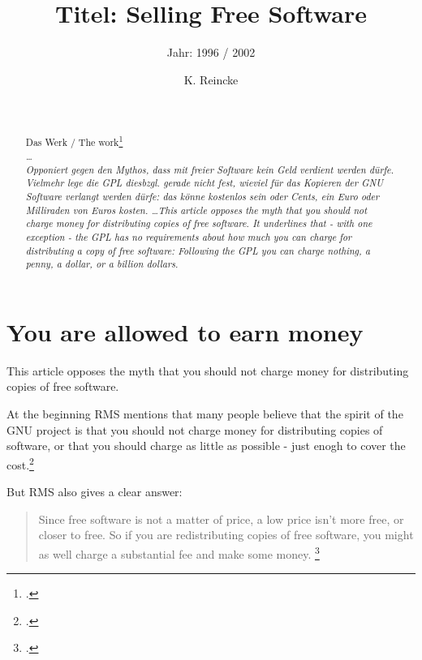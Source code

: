 \documentclass[DIV=calc,BCOR=5mm,11pt,headings=small,oneside,abstract=true, toc=bib]{scrartcl}
\begin{document}

\titlehead{Literaturexzerpt}
\subject{Autor(en): Stallman / Stallman1996b}
\title{Titel: Selling Free Software}
\subtitle{Jahr: 1996 / 2002 }
\author{K. Reincke}

\maketitle

\begin{abstract}
\noindent
\cite[(in:)][]{StaGay2002a} \\
\noindent
\cite[(ist:)][]{Stallman1996b} \\
Das Werk / The work\footcite[][]{Stallman1996b} \\
\noindent \itshape
\ldots  
\\ Opponiert gegen den Mythos, dass mit freier Software kein Geld verdient
werden dürfe. Vielmehr lege die GPL diesbzgl. gerade nicht fest, wieviel für das
Kopieren der GNU Software verlangt werden dürfe: das könne kostenlos sein oder
Cents, ein Euro oder Milliraden von Euros kosten.
\noindent
\ldots This article opposes the myth that you should not charge money for
distributing copies of free software. It underlines that - with one exception -
the GPL has no requirements about how much you can charge for distributing a
copy of free software: Following the GPL you can charge nothing, a penny, a
dollar, or a billion dollars.
\end{abstract}
\footnotesize
\normalsize

\section{You are allowed to earn money}
This article opposes the myth that you should not charge money for
distributing copies of free software. 

At the beginning RMS mentions that \glqq{}many people believe that the
spirit of the GNU project is that you should not charge money for
distributing copies of software, or that you should charge as little as
possible - just enogh to cover the cost.\grqq{}\footcite[cf][63]{Stallman1996b}

But RMS also gives a clear answer:

\begin{quote}
\glqq{}Since free software is not a matter of price, a low price isn't more
free, or closer to free. So if you are redistributing copies of free software,
you might as well charge a substantial fee and make some money.
\grqq{}\footcite[cf][63]{Stallman1996b}
\end{quote}
\end{document}
